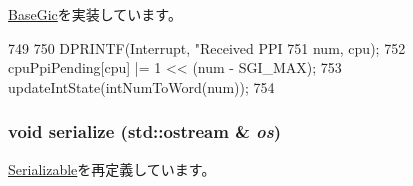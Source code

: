 \hyperlink{classBaseGic_a89cc9c4f60c3456dca807a71da1e04a8}{BaseGic}を実装しています。


\begin{DoxyCode}
749 {
750     DPRINTF(Interrupt, "Received PPI %
751             num, cpu);
752     cpuPpiPending[cpu] |= 1 << (num - SGI_MAX);
753     updateIntState(intNumToWord(num));
754 }
\end{DoxyCode}
\hypertarget{classPl390_a53e036786d17361be4c7320d39c99b84}{
\subsubsection[{serialize}]{\setlength{\rightskip}{0pt plus 5cm}void serialize (std::ostream \& {\em os})}}
\label{classPl390_a53e036786d17361be4c7320d39c99b84}


\hyperlink{classSerializable_ad6272f80ae37e8331e3969b3f072a801}{Serializable}を再定義しています。



